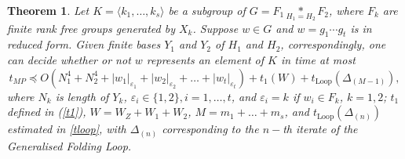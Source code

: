 \documentclass[a4paper,12pt]{article}
\newcommand{\D}{\Delta }
\newcommand{\e}{\varepsilon }
\newtheorem{theorem}{Theorem}[section]
\numberwithin{equation}{section}
\numberwithin{figure}{section}
\newcommand{\Loop}{\operatorname{Loop}}
\newcommand{\la}{\langle}
\newcommand{\ra}{\rangle}
\begin{document}
\begin{theorem}\label{th:complexity} Let $K=\la k_1, \ldots , k_s\ra$ be a subgroup of $G = F_1 \underset{H_1=H_2}{\ast} F_2$, where $F_k$ are finite rank free groups generated by $X_k$.
 Suppose $w \in G$ and $w=g_1 \cdots g_t$ is in reduced
form. Given finite bases $Y_1$ and $Y_2$ of $H_1$ and $H_2$, correspondingly, one can decide whether or not $w$ represents an element of $K$ in time at most 
\begin{equation}\label{eq:alg_compl} t_{MP} \preceq O(N_1^4 + N_2^4+ |w_1|_{\e_1}+|w_2|_{\e_2}+
\ldots +|w_t|_{\e_t})+ t_1(W)+t_{\Loop}(\D_{(M-1)}),
\end{equation}
where $N_k$ is length of $Y_k$, $\e_i \in \{ 1, 2\}, i = 1, \ldots,
t$, and $\e_i = k$ if $w_i \in F_k$, $k = 1,2$; $t_1$ defined in (\ref{t1}), $W = W_Z +W_1 +W_2$, $M = m_1 + \ldots + m_s$, and $t_{\Loop}(\D_{(n)})$ estimated in \eqref{tloop}, with $\D_{(n)}$ corresponding to the $n-$th iterate of the Generalised Folding Loop.
\end{theorem}
\end{document}
